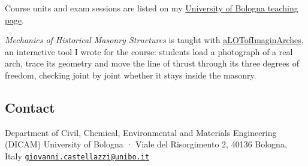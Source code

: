 \documentclass[
  10pt,
  a4paper,
  DIV=11,
  numbers=noendperiod]{scrartcl}
\begin{document}
Course units and exam sessions are listed on my
\href{https://www.unibo.it/sitoweb/giovanni.castellazzi/teachings}{University
of Bologna teaching page}.

\begin{tcolorbox}[enhanced jigsaw, arc=.35mm, bottomrule=.15mm, breakable, colback=white, colframe=quarto-callout-note-color-frame, left=2mm, leftrule=.75mm, opacityback=0, rightrule=.15mm, toprule=.15mm]
\begin{minipage}[t]{5.5mm}
\textcolor{quarto-callout-note-color}{\faInfo}
\end{minipage}%
\begin{minipage}[t]{\textwidth - 5.5mm}

\emph{Mechanics of Historical Masonry Structures} is taught with
\href{https://gcastellazzi.github.io/aLoTiA/app/}{aLOTofImaginArches},
an interactive tool I wrote for the course: students load a photograph
of a real arch, trace its geometry and move the line of thrust through
its three degrees of freedom, checking joint by joint whether it stays
inside the masonry.

\end{minipage}%
\end{tcolorbox}

\subsection{Contact}\label{contact}

Department of Civil, Chemical, Environmental and Materials Engineering
(DICAM) University of Bologna · Viale del Risorgimento 2, 40136 Bologna,
Italy
\href{mailto:giovanni.castellazzi@unibo.it}{\nolinkurl{giovanni.castellazzi@unibo.it}}
\end{document}

